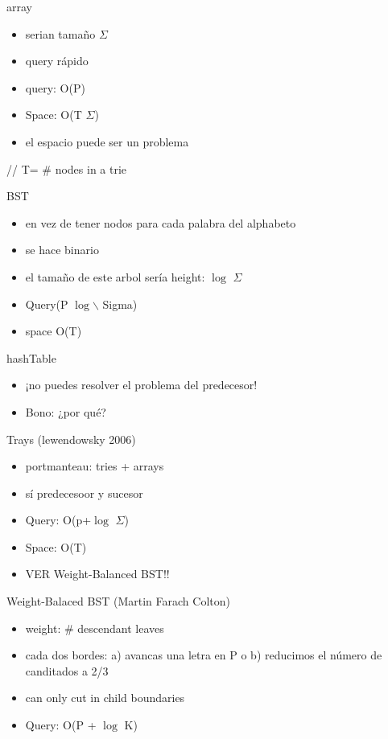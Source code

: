 \documentclass[presentation]{beamer}
\begin{document}
\begin{frame}[label=sec-10]{array}
\begin{itemize}
\item serian tamaño $\Sigma$
\item query rápido
\item query: O(P)
\item Space: O(T $\Sigma$)
\item el espacio puede ser un problema
\end{itemize}
// T= \# nodes in a trie
\end{frame}
\begin{frame}[label=sec-11]{BST}
\begin{itemize}
\item en vez de tener nodos para cada palabra del alphabeto
\item se hace binario
\item el tamaño de este arbol sería height: $\log$ $\Sigma$
\item Query(P  $\log$$\backslash$ Sigma)
\item space O(T)
\end{itemize}
\end{frame}

\begin{frame}[label=sec-12]{hashTable}
\begin{itemize}
\item ¡no puedes resolver el problema del predecesor!
\item Bono: ¿por qué?
\end{itemize}
\end{frame}



\begin{frame}[label=sec-13]{Trays (lewendowsky 2006)}
\begin{itemize}
\item portmanteau: tries + arrays
\item sí predecesoor y sucesor
\item Query: O(p+$\log$ $\Sigma$)
\item Space: O(T)
\item VER Weight-Balanced BST!!
\end{itemize}
\end{frame}

\begin{frame}[label=sec-14]{Weight-Balaced BST (Martin Farach Colton)}
\begin{itemize}
\item weight: \# descendant leaves
\item cada dos bordes: a) avancas una letra en P o b) reducimos el número de canditados a 2/3
\item can only cut in child boundaries
\item Query: O(P + $\log$ K)
\end{itemize}
\end{frame}
\end{document}

